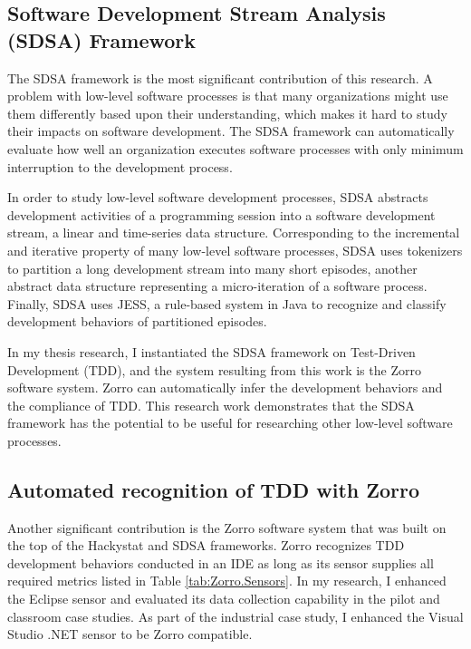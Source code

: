 \subsection{Software Development Stream Analysis (SDSA) Framework}
The SDSA framework is the most significant contribution of this research. A problem with low-level software processes is that many organizations might use them differently based upon their understanding, which makes it hard to study their impacts on software development. The SDSA framework can automatically evaluate how well an organization executes software processes with only minimum interruption to the development process.

In order to study low-level software development processes, SDSA abstracts development activities of a programming session into a software development stream, a linear and time-series data structure. Corresponding to the incremental and iterative property of many low-level software processes, SDSA uses tokenizers to partition a long development stream into many short episodes, another abstract data structure representing a micro-iteration of a software process. 
Finally, SDSA uses JESS, a rule-based system in Java to recognize and classify development behaviors of partitioned episodes. 

In my thesis research, I instantiated the SDSA framework on Test-Driven Development (TDD), and the system resulting from this work is the Zorro software system. Zorro can automatically infer the development behaviors and the compliance of TDD. This research work demonstrates that the SDSA framework has the potential to be useful for researching other low-level software processes. 

\subsection{Automated recognition of TDD with Zorro}
Another significant contribution is the Zorro software system that was built on the top of the Hackystat and SDSA frameworks. Zorro recognizes TDD development behaviors conducted in an IDE as long as its sensor supplies all required metrics listed in Table \ref{tab:Zorro.Sensors}. In my research, I enhanced the Eclipse sensor and evaluated its data collection capability in the pilot and classroom case studies. As part of the industrial case study, I enhanced the Visual Studio .NET sensor to be Zorro compatible. 

